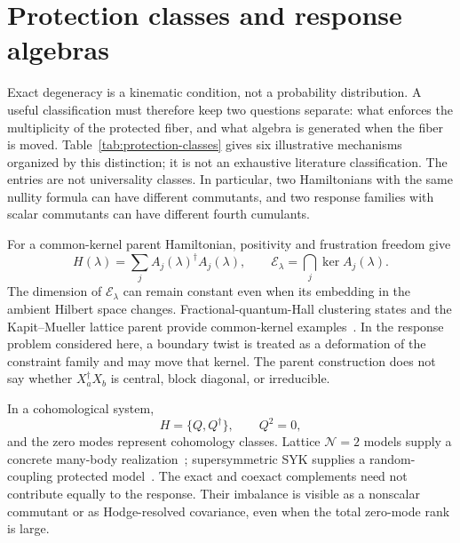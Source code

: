 \section{Protection classes and response algebras}
\label{sec:protection-classes}

Exact degeneracy is a kinematic condition, not a probability distribution.  A useful classification must therefore keep two questions separate: what enforces the multiplicity of the protected fiber, and what algebra is generated when the fiber is moved.  Table~\ref{tab:protection-classes} gives six illustrative mechanisms organized by this distinction; it is not an exhaustive literature classification.  The entries are not universality classes.  In particular, two Hamiltonians with the same nullity formula can have different commutants, and two response families with scalar commutants can have different fourth cumulants.

\begin{table}[t]
\caption{\label{tab:protection-classes}Illustrative, non-exhaustive mechanisms that produce an exactly degenerate subspace.  The protection law determines the existence and dimension of the fiber, whereas the accessible tangent set determines the response algebra.  Neither column by itself fixes a random-matrix ensemble.}

\end{table}

For a common-kernel parent Hamiltonian, positivity and frustration freedom give
\begin{equation}
 H(\lambda)=\sum_j A_j(\lambda)^\dagger A_j(\lambda),\qquad
 \mathcal E_\lambda=\bigcap_j\ker A_j(\lambda).
 \label{eq:common-kernel}
\end{equation}
The dimension of $\mathcal E_\lambda$ can remain constant even when its embedding in the ambient Hilbert space changes.  Fractional-quantum-Hall clustering states and the Kapit--Mueller lattice parent provide common-kernel examples~\cite{laughlin1983,mooreread1991,kapitmueller2010}.  In the response problem considered here, a boundary twist is treated as a deformation of the constraint family and may move that kernel.  The parent construction does not say whether $X_a^\dagger X_b$ is central, block diagonal, or irreducible.

In a cohomological system,
\begin{equation}
 H=\{Q,Q^\dagger\},\qquad Q^2=0,
 \label{eq:cohomological-parent}
\end{equation}
and the zero modes represent cohomology classes.  Lattice $\mathcal N=2$ models supply a concrete many-body realization~\cite{fendley2003,huijse2010supsym}; supersymmetric SYK supplies a random-coupling protected model~\cite{fu2017susy}.  The exact and coexact complements need not contribute equally to the response.  Their imbalance is visible as a nonscalar commutant or as Hodge-resolved covariance, even when the total zero-mode rank is large.

